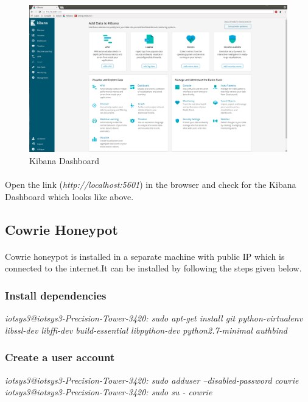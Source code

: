 \documentclass{report}
\begin{document}
\begin{figure}[H]
\centering
\caption{Kibana Dashboard}
\includegraphics[scale=0.22]{Kibana_Installation}
\end{figure}

\paragraph{}
Open the link (\textit{http://localhost:5601}) in the browser and check for the Kibana Dashboard which looks like above.


\subsection{Cowrie Honeypot}

\paragraph{}
Cowrie honeypot is installed in a separate machine with public IP which is connected to the internet.It can be installed by following the steps given below.

\subsubsection{Install dependencies } 
\textit{{\color{blue}iotsys3@iotsys3-Precision-Tower-3420:} sudo apt-get install git python-virtualenv libssl-dev libffi-dev build-essential libpython-dev python2.7-minimal authbind}

\subsubsection{Create a user account } 
\textit{{\color{blue}iotsys3@iotsys3-Precision-Tower-3420:} sudo adduser --disabled-password cowrie}\\
\textit{{\color{blue}iotsys3@iotsys3-Precision-Tower-3420:} sudo su - cowrie}
\end{document}
